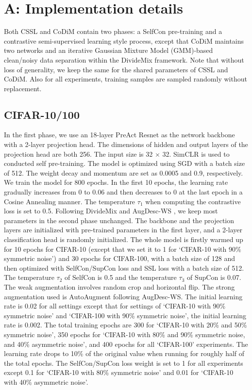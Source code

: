 \documentclass[letterpaper]{article} \usepackage{aaai22}  \usepackage{times}  \usepackage{helvet}  \usepackage{courier}  \usepackage[hyphens]{url}  \usepackage{graphicx} \usepackage{subfigure}
\begin{document}
\clearpage


\clearpage
\appendix
\section{A: Implementation details}
Both CSSL and CoDiM contain two phases: a SelfCon pre-training and a contrastive semi-supervised learning style process, except that CoDiM maintains two networks and an iterative Gaussian Mixture Model (GMM)-based clean/noisy data separation within the DivideMix framework. Note that without loss of generality, we keep the same for the shared parameters of CSSL and CoDiM. Also for all experiments, training samples are sampled randomly without replacement.
\subsection{CIFAR-10/100}
In the first phase, we use an 18-layer PreAct Resnet as the network backbone with a 2-layer projection head. The dimensions of hidden and output layers of the projection head are both 256. The input size is 32 $\times$ 32. SimCLR is used to conducted self pre-training. The model is optimized using SGD with a batch size of 512. The weight decay and momentum are set as 0.0005 and 0.9, respectively. We train the model for 800 epochs. In the first 10 epochs, the learning rate gradually increases from 0 to 0.06 and then decreases to 0 at the last epoch in a Cosine Annealing manner. The temperature $\tau_1$ when computing the contrastive loss is set to 0.5. Following DivideMix \cite{li2020dividemix} and AugDesc-WS \cite{nishi2021augmentation}, we keep most parameters in the second phase unchanged. The backbone and the projection layers are initialized with pre-trained parameters in the first layer, and a 2-layer classification head is randomly initialized. The whole model is firstly warmed up for 10 epochs for CIFAR-10 (except that we set it to 1 for `CIFAR-10 with 90\% symmetric noise') and 30 epochs for CIFAR-100, with a batch size of 128 and then optimized with SelfCon/SupCon loss and SSL loss with a batch size of 512. The temperature $\tau_2$ of SelfCon is 0.5 and the temperature $\tau_{3}$ of SupCon is 0.07. The weak augmentation involves random crop and horizontal flip. The strong augmentation used is AutoAugment following AugDesc-WS. The initial learning rate is 0.02 for all settings except that for settings of `CIFAR-10 with 90\% symmetric noise' and `CIFAR-100 with 90\% symmetric noise', the initial learning rate is 0.002. The total training epochs are 300 for `CIFAR-10 with 20\% and 50\% symmetric noise', 350 epochs for `CIFAR-10 with 80\% and 90\% symmetric noise, and 40\% asymmetric noise', and 400 epochs for all `CIFAR-100' experiments. The learning rate drops to 10\% of the original value when running for roughly half of the total epochs. The SelfCon/SupCon loss weight is set to 1 for all experiments except 0.1 for `CIFAR-10 with 80\% symmetric noise' and 0.01 for `CIFAR-10 with 40\% asymmetric noise'.
\end{document}
